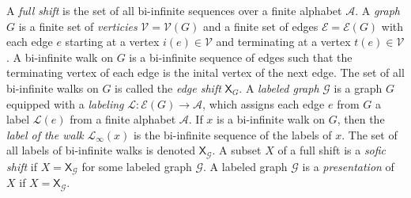 \documentclass{article}
\newcommand{\Ac}{\mathcal{A}}  %
\newcommand{\Lc}{\mathcal{L}}  %
\newcommand{\Gc}{\mathcal{G}}  %
\newcommand{\Vc}{\mathcal{V}}
\newcommand{\Ec}{\mathcal{E}}
\newcommand{\shift}[1]{\mathsf{X}_{#1}}
\newcommand{\term}[1]{\textit{#1}}
\begin{document}

A \term{full shift} is the set of all bi-infinite sequences over a finite alphabet \(\Ac\).
A \term{graph} \(G\) is a finite set of \term{verticies} \(\Vc=\Vc(G)\) and a finite set 
of edges \(\Ec = \Ec(G)\) with each edge \(e\) starting at a vertex \(i(e) \in \Vc\)
and terminating at a vertex \(t(e) \in \Vc\). 
A bi-infinite walk on \(G\) is a bi-infinite sequence of edges such that the 
terminating vertex of each edge is the inital vertex of the next edge. The set of 
all bi-infinite walks on \(G\) is called the \term{edge shift} \(\shift{G}\).
A \term{labeled graph} \(\Gc\)
is a graph \(G\) equipped with a \term{labeling} \(\Lc: \Ec(G) \to \Ac\), which assigns each
edge \(e\) from \(G\) a label \(\Lc(e)\) from a finite alphabet \(\Ac\). If \(x\) is 
a bi-infinite walk on \(G\), then the \term{label of the walk} \(\Lc_\infty(x)\) is 
the bi-infinite sequence of the labels of \(x\). The set of all labels of bi-infinite 
walks is denoted \(\shift{\Gc}\). A subset \(X\) of a full shift is a \term{sofic shift} if \(X = \shift{\Gc}\)
for some labeled graph \(\Gc\). A labeled graph \(\Gc\) is a \term{presentation} 
of \(X\) if \(X=\shift{\Gc}\).
\end{document}
